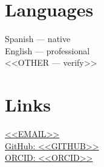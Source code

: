 \documentclass[10pt,a4paper]{article}
\newlength{\leftcolwidth}
\newlength{\colsep}
\begin{document}
\begin{minipage}[t]{\leftcolwidth}
\section{Languages}

Spanish — native\\
English — professional\\
<<OTHER — verify>>

\section{Links}

\href{mailto:<<EMAIL>>}{<<EMAIL>>}\\
\href{https://github.com/<<GITHUB>>}{GitHub: <<GITHUB>>}\\
\href{https://orcid.org/<<ORCID>>}{ORCID: <<ORCID>>}

\end{minipage}%
\hspace{\colsep}%
\end{document}
